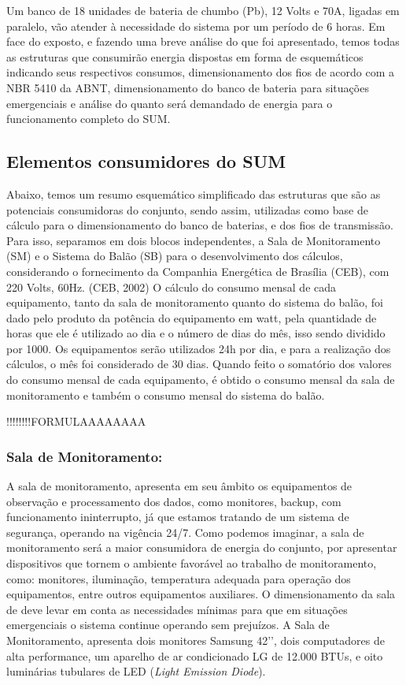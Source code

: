 Um banco de 18 unidades de bateria de chumbo (Pb), 12 Volts e 70A, ligadas em paralelo, vão atender à necessidade do sistema por um período de 6 horas.
Em face do exposto, e fazendo uma breve análise do que foi apresentado, temos todas as estruturas que consumirão energia dispostas em forma de esquemáticos indicando seus respectivos consumos, dimensionamento dos fios de acordo com a NBR 5410 da ABNT, dimensionamento do banco de bateria para situações emergenciais e análise do quanto será demandado de energia para o funcionamento completo do SUM.

\subsection{Elementos consumidores do SUM}

Abaixo, temos um resumo esquemático simplificado das estruturas que são as potenciais consumidoras do conjunto, sendo assim, utilizadas como base de cálculo para o dimensionamento do banco de baterias, e dos fios de transmissão.
	Para isso, separamos em dois blocos independentes, a Sala de Monitoramento (SM) e o Sistema do Balão (SB)  para o desenvolvimento dos cálculos, considerando o fornecimento da Companhia Energética de Brasília (CEB), com 220 Volts, 60Hz. (CEB, 2002)
	O cálculo do consumo mensal de cada equipamento, tanto da sala de monitoramento quanto do sistema do balão, foi dado pelo produto da potência do equipamento em watt, pela quantidade de horas que ele é utilizado ao dia e o número de dias do mês, isso sendo dividido por 1000. Os equipamentos serão utilizados 24h por dia, e para a realização dos cálculos, o mês foi considerado de 30 dias.
Quando feito o somatório dos valores do consumo mensal de cada equipamento, é obtido o consumo mensal da sala de monitoramento e também o consumo mensal do sistema do balão.

 !!!!!!!!FORMULAAAAAAAA

 \subsubsection{Sala de Monitoramento:}

 A sala de monitoramento, apresenta em seu âmbito os equipamentos de observação e processamento dos dados, como monitores, backup, com funcionamento ininterrupto, já que estamos tratando de um sistema de segurança, operando na vigência 24/7.
Como podemos imaginar, a sala de monitoramento será a maior consumidora de energia do conjunto, por apresentar dispositivos que tornem o ambiente favorável ao trabalho de monitoramento, como: monitores, iluminação, temperatura adequada para operação dos equipamentos, entre outros equipamentos auxiliares. O dimensionamento da sala de deve levar em conta as necessidades mínimas para que em situações emergenciais o sistema continue operando sem prejuízos.
A Sala de Monitoramento, apresenta dois monitores Samsung 42’’, dois computadores de alta performance, um aparelho de ar condicionado LG de 12.000 BTUs, e oito luminárias tubulares de LED (\textit{Light Emission Diode}).



